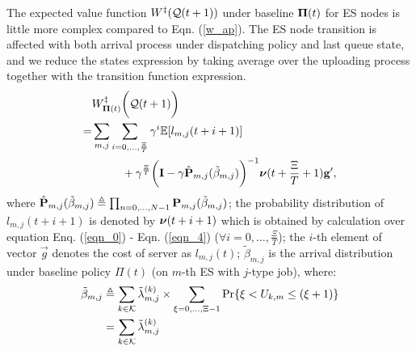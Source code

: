 The expected value function $W^{\ddagger}(\mathcal{Q}(t+1))$ under baseline $\boldsymbol{\Pi}(t)$ for ES nodes is little more complex compared to Eqn. (\ref{w_ap}).
The ES node transition is affected with both arrival process under dispatching policy and last queue state, and we reduce the states expression by taking average over the uploading process together with the transition function expression.
\begin{align}
    &W^{\ddagger}_{\boldsymbol{\Pi}(t)}\bigg(\mathcal{Q}(t+1)\bigg)
    \nonumber\\
    =& \sum_{m,j}\sum_{i=0,\dots,\frac{\Xi}{T}} \gamma^{i} \mathbb{E}[ l_{m,j}({t+i+1}) ]
    \nonumber\\
    &~~~~~~~~+ \gamma^{\frac{\Xi}{T}} \bigg( \mathbf{I} - \gamma \hat{\mathbf{P}}_{m,j}(\tilde{\beta}_{m,j}) \bigg)^{-1} \boldsymbol{\nu}({t+\frac{\Xi}{T}+1}) \mathbf{g}',
\end{align}
where $\hat{\mathbf{P}}_{m,j}(\tilde{\beta}_{m,j}) \triangleq \prod_{n=0,\dots,N-1} \mathbf{P}_{m,j}(\tilde{\beta}_{m,j})$;
the probability distribution of $l_{m,j}({t+i+1})$ is denoted by $\boldsymbol{\nu}({t+i+1})$ which is obtained by calculation over equation Enq. (\ref{eqn_0}) - Eqn. (\ref{eqn_4}) ($\forall i=0,\dots,\frac{\Xi}{T}$);
the $i$-th element of vector $\vec{g}$ denotes the cost of server as $l_{m,j}(t)$;
$\tilde{\beta}_{m,j}$ is the arrival distribution under baseline policy $\Pi(t)$ (on $m$-th ES with $j$-type job), where:
\begin{align}
    \tilde{\beta}_{m,j} &\triangleq \sum_{k\in\mathcal{K}} \tilde{\lambda}^{(k)}_{m,j} \times \sum_{\xi=0,\dots,\Xi-1} \Pr\{ \xi<U_{k,m}\leq(\xi+1) \}
        \nonumber\\
    ~~~~&= \sum_{k\in\mathcal{K}} \tilde{\lambda}^{(k)}_{m,j}
\end{align}

